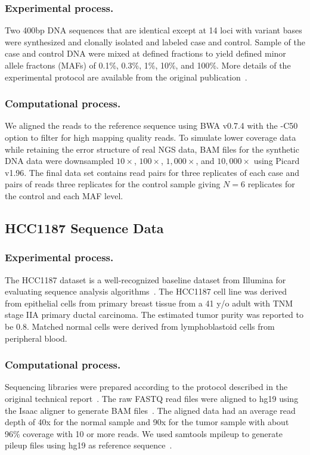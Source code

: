 \documentclass{bioinfo}
\begin{document}
\subsubsection*{Experimental process.}
Two 400bp DNA sequences that are identical except at 14 loci with variant bases were synthesized and clonally isolated and labeled case and control. Sample of the case and control DNA were mixed at defined fractions to yield defined minor allele fractons (MAFs) of 0.1\%, 0.3\%, 1\%, 10\%, and 100\%. More details of the experimental protocol are available from the original publication~\citep{Flaherty:2011ja}.

\subsubsection*{Computational process.}
 We aligned the reads to the reference sequence using BWA v0.7.4 with the -C50 option to filter for high mapping quality reads. To simulate lower coverage data while retaining the error structure of real NGS data, BAM files for the synthetic DNA data were downsampled $10\times$, $100\times$, $1,000\times$, and $10,000\times$ using Picard v1.96. The final data set contains read pairs for three replicates of each case and pairs of reads three replicates for the control sample giving $N=6$ replicates for the control and each MAF level.

\subsection{HCC1187 Sequence Data}
\subsubsection*{Experimental process.}
The HCC1187 dataset is a well-recognized baseline dataset from Illumina for evaluating sequence analysis algorithms~\citep{newman2013relative,howarth2011large,howarth2007array}. The HCC1187 cell line was derived from  epithelial cells from primary breast tissue from a 41 y/o adult with TNM stage IIA primary ductal carcinoma. The estimated tumor purity was reported to be 0.8. Matched normal cells were derived from lymphoblastoid cells from peripheral blood. 
\subsubsection*{Computational process.}
Sequencing libraries were prepared according to the protocol described in the original technical report~\citep{hcc1187techreport}. The raw FASTQ read files were aligned to hg19 using the Isaac aligner to generate BAM files~\citep{raczy2013isaac}. The aligned data had an average read depth of 40x for the normal sample and 90x for the tumor sample with about 96\% coverage with 10 or more reads. We used samtools mpileup to generate pileup files using hg19 as reference sequence~\citep{Navin:2010gu}.
\end{document}
